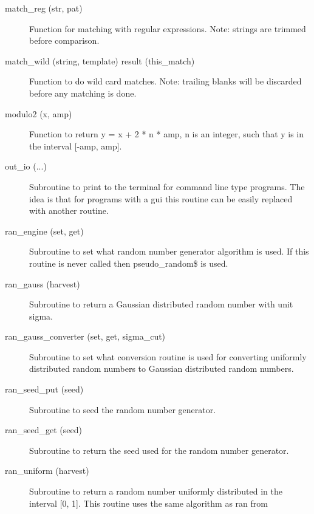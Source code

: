 \begin{description}
\label{r:match.reg}
\item[match_reg (str, pat)] \Newline 
Function for matching with regular expressions.
Note: strings are trimmed before comparison.

\label{r:match.wild}
\item[match_wild (string, template) result (this_match)] \Newline 
Function to do wild card matches. Note: trailing blanks will be discarded
before any matching is done.

\label{r:modulo2}
\item[modulo2 (x, amp)] \Newline 
Function to return y = x + 2 * n * amp, n is an integer, such that y is 
in the interval [-amp, amp].

\label{r:out.io}
\item[out_io (...)] \Newline 
Subroutine to print to the terminal for command line type programs.
The idea is that for programs with a gui this routine can be easily
replaced with another routine.

\label{r:ran.engine}
\item[ran_engine (set, get)] \Newline 
Subroutine to set what random number generator algorithm is used.
If this routine is never called then pseudo_random\$ is used.

\label{r:ran.gauss}
\item[ran_gauss (harvest)] \Newline 
Subroutine to return a Gaussian distributed random number with unit sigma.

\label{r:ran.gauss.converter}
\item[ran_gauss_converter (set, get, sigma_cut)] \Newline 
Subroutine to set what conversion routine is used for converting
uniformly distributed random numbers to Gaussian distributed random numbers.

\label{r:ran.seed.put}
\item[ran_seed_put (seed)] \Newline 
Subroutine to seed the random number generator. 

\label{r:ran.seed.get}
\item[ran_seed_get (seed)] \Newline 
Subroutine to return the seed used for the random number generator.

\label{r:ran.uniform}
\item[ran_uniform (harvest)] \Newline 
Subroutine to return a random number uniformly distributed in the 
interval [0, 1]. This routine uses the same algorithm as ran from


\end{description}
